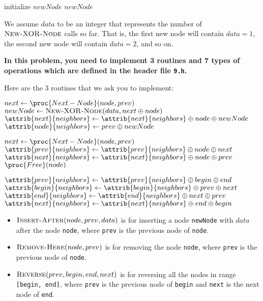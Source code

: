 \begin{codebox}
\li initialize $newNode$
\li \Return $newNode$
\End
\end{codebox}

We assume $data$ to be an integer that represents the number of $\textsc{New-XOR-Node}$ calls so far. That is, the first new node will contain $data = 1$, the second new node will contain $data = 2$, and so on.

\noindent\textbf{In this problem, you need to implement 3 routines and 7 types of operations which are defined in the header file \texttt{9.h}.}

\noindent Here are the 3 routines that we ask you to implement:

\begin{codebox}
\li $next \gets \proc{Next-Node}(node, prev)$
\li $newNode \gets \textsc{New-XOR-Node}(data, next \oplus node)$
\li $\attrib{next}{neighbors} \gets \attrib{next}{neighbors} \oplus node \oplus newNode$
\li $\attrib{node}{neighbors} \gets prev \oplus newNode$
\End
\end{codebox}

\begin{codebox}
\li $next \gets \proc{Next-Node}(node, prev)$
\li $\attrib{prev}{neighbors} \gets \attrib{prev}{neighbors} \oplus node \oplus next$
\li $\attrib{next}{neighbors} \gets \attrib{next}{neighbors} \oplus node \oplus prev$
\li $\proc{Free}(node)$
\End
\end{codebox}

\begin{codebox}
\li $\attrib{prev}{neighbors} \gets \attrib{prev}{neighbors} \oplus begin \oplus end$
\li $\attrib{begin}{neighbors} \gets \attrib{begin}{neighbors} \oplus prev \oplus next$
\li $\attrib{end}{neighbors} \gets \attrib{end}{neighbors} \oplus next \oplus prev$
\li $\attrib{next}{neighbors} \gets \attrib{next}{neighbors} \oplus end \oplus begin$
\End
\end{codebox}

\begin{itemize}
    \item $\textsc{Insert-After}(node, prev, data)$ is for inserting a node \texttt{newNode} with $data$ after the node \texttt{node}, where \texttt{prev} is the previous node of \texttt{node}.
    \item $\textsc{Remove-Here}(node, prev)$ is for removing the node \texttt{node}, where \texttt{prev} is the previous node of \texttt{node}.
    \item $\textsc{Reverse}(prev, begin, end, next)$ is for reversing all the nodes in range \texttt{[begin, end]}, where \texttt{prev} is the previous node of \texttt{begin} and \texttt{next} is the next node of \texttt{end}.
\end{itemize}


